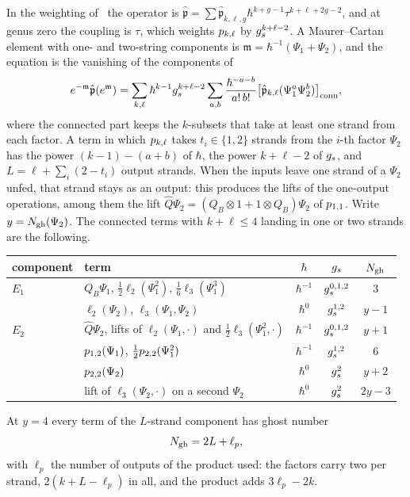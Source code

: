 \noindent{}
In the weighting of~\cite{Cieliebak:2015:HomologicalAlgebraRelated} the operator is $\hat{\mathfrak{p}} = \sum \hat{\mathfrak{p}}_{k, \ell, g} \hbar^{k + g - 1} \tau^{k + \ell + 2 g - 2}$, and at genus zero the coupling is $\tau$, which weights $p_{k,\ell}$ by $g_s^{k + \ell - 2}$.
A Maurer--Cartan element with one- and two-string components is $\mathfrak{m} = \hbar^{-1} (\Psi_1 + \Psi_2)$, and the equation is the vanishing of the components of
\begin{equation}
  \label{ch11:eq:mc-expansion}
  e^{- \mathfrak{m}} \hat{\mathfrak{p}} (e^{\mathfrak{m}})
    = \sum_{k, \ell} \hbar^{k - 1} g_s^{k + \ell - 2} \sum_{a, b} \frac{\hbar^{- a - b}}{a! \, b!} \bigl[ \hat{\mathfrak{p}}_{k, \ell} (\Psi_1^a \Psi_2^b) \bigr]_{\mathrm{conn}},
\end{equation}
where the connected part keeps the $k$-subsets that take at least one strand from each factor.
A term in which $p_{k,\ell}$ takes $t_i \in \{1, 2\}$ strands from the $i$-th factor $\Psi_2$ has the power $(k - 1) - (a + b)$ of $\hbar$, the power $k + \ell - 2$ of $g_s$, and $L = \ell + \sum_i (2 - t_i)$ output strands.
When the inputs leave one strand of a $\Psi_2$ unfed, that strand stays as an output: this produces the lifts of the one-output operations, among them the lift $\hat{Q} \Psi_2 = (Q_B \otimes 1 + 1 \otimes Q_B) \Psi_2$ of $p_{1,1}$.
Write $y = N_{\text{gh}}(\Psi_2)$.
The connected terms with $k + \ell \le 4$ landing in one or two strands are the following.
\begin{center}
  \small
  \begin{tabular}{llccc}
    \toprule
    component & term & $\hbar$ & $g_s$ & $N_{\text{gh}}$ \\
    \midrule
    $E_1$ & $Q_B \Psi_1$, $\tfrac{1}{2} \ell_2(\Psi_1^2)$, $\tfrac{1}{6} \ell_3(\Psi_1^3)$ & $\hbar^{-1}$ & $g_s^{0, 1, 2}$ & $3$ \\
    & $\ell_2(\Psi_2)$, $\ell_3(\Psi_1, \Psi_2)$ & $\hbar^0$ & $g_s^{1, 2}$ & $y - 1$ \\
    $E_2$ & $\hat{Q} \Psi_2$, lifts of $\ell_2(\Psi_1, \cdot)$ and $\tfrac{1}{2} \ell_3(\Psi_1^2, \cdot)$ & $\hbar^{-1}$ & $g_s^{0, 1, 2}$ & $y + 1$ \\
    & $p_{1,2}(\Psi_1)$, $\tfrac{1}{2} p_{2,2}(\Psi_1^2)$ & $\hbar^{-1}$ & $g_s^{1, 2}$ & $6$ \\
    & $p_{2,2}(\Psi_2)$ & $\hbar^0$ & $g_s^2$ & $y + 2$ \\
    & lift of $\ell_3(\Psi_2, \cdot)$ on a second $\Psi_2$ & $\hbar^0$ & $g_s^2$ & $2 y - 3$ \\
    \bottomrule
  \end{tabular}
\end{center}
At $y = 4$ every term of the $L$-strand component has ghost number
\begin{equation}
  \label{ch11:eq:ghost-rule}
  N_{\text{gh}}
    = 2 L + \ell_p,
\end{equation}
with $\ell_p$ the number of outputs of the product used: the factors carry two per strand, $2 (k + L - \ell_p)$ in all, and the product adds $3 \ell_p - 2 k$.

